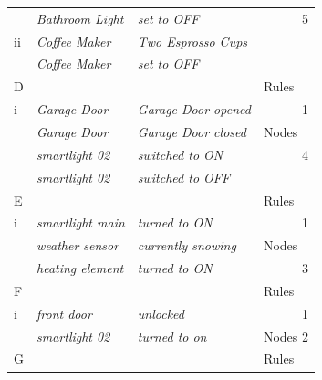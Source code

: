 \begin{table}[!ht]
{\begin{tabular}{llll}
              & \textit{Bathroom Light}       & \textit{set to OFF}                       & \multicolumn{1}{r}{5}     \\
ii            & \textit{Coffee Maker}         & \textit{Two Esprosso Cups}                &                           \\
              & \textit{Coffee Maker}         & \textit{set to OFF}                       &                           \\ \hline
D             & \textit{}                     & \textit{}                                 & Rules                     \\
i             & \textit{Garage Door}          & \textit{Garage Door opened}               & \multicolumn{1}{r}{1}     \\
              & \textit{Garage Door}          & \textit{Garage Door closed}               & Nodes                     \\
              & \textit{smartlight 02}        & \textit{switched to ON}                   & \multicolumn{1}{r}{4}     \\
              & \textit{smartlight 02}        & \textit{switched to OFF}                  &                           \\ \hline
E             & \textit{}                     & \textit{}                                 & Rules                     \\
i             & \textit{smartlight main}      & \textit{turned to ON}                     & \multicolumn{1}{r}{1}     \\
              & \textit{weather sensor}       & \textit{currently snowing}                & Nodes                     \\
              & \textit{heating element}      & \textit{turned to ON}                     & \multicolumn{1}{r}{3}     \\ \hline
F             & \textit{}                     & \textit{}                                 & Rules                     \\
i             & \textit{front door}           & \textit{unlocked}                         & \multicolumn{1}{r}{1}     \\
              & \textit{smartlight 02}        & \textit{turned to on}                     & Nodes                   2 \\ \hline
G             & \textit{}                     & \textit{}                                 & Rules                     \\

\end{tabular}}
\end{table}
